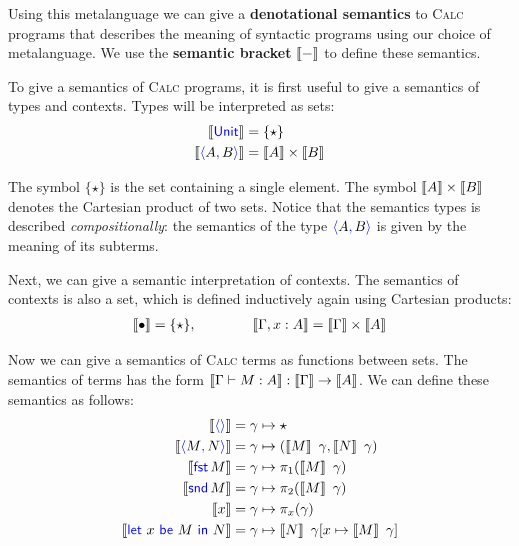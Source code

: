 Using this metalanguage we can give a \textbf{denotational semantics} to
\textsc{Calc} programs that describes the meaning of syntactic programs using 
our choice of metalanguage.
We use the \textbf{semantic bracket} $\left\llbracket - \right\rrbracket$ to define these semantics.

To give a semantics of \textsc{Calc} programs, it is first useful to give a
semantics of types and contexts.  Types will be interpreted as sets:
\begin{align*}
  \dbracket{\plUnit} &= \{\star\} \\
  \dbracket{\plpair{A}{B}} &= \dbracket{A} \times \dbracket{B}
\end{align*}

The symbol $\{\star\}$ is the set containing a single element. The symbol
$\left\llbracket A \right\rrbracket \times \left\llbracket B \right\rrbracket$ denotes the Cartesian product of two sets.
Notice that the semantics types is described \emph{compositionally}: the 
semantics of the type $\plpair{A}{B}$ is given by the meaning of its subterms.

Next, we can give a semantic interpretation of contexts. The semantics of 
contexts is also a set, which is defined inductively 
again using Cartesian products:
\begin{align*}
  \left\llbracket \bullet \right\rrbracket = \{\star\},
  \qquad\qquad
  \left\llbracket \Gamma, x : A \right\rrbracket =  \left\llbracket \Gamma \right\rrbracket \times \left\llbracket A \right\rrbracket
\end{align*}

Now we can give a semantics of \textsc{Calc} terms as functions between sets. 
The semantics of terms has the form $\left\llbracket \Gamma \vdash M : A \right\rrbracket
: \left\llbracket \Gamma \right\rrbracket \to \left\llbracket A \right\rrbracket$.
We can define these semantics as follows:
\begin{align*}
  \dbracket{\plunit{}} &= \gamma \mapsto \star\\
  \dbracket{\plpair{M}{N}} &= \gamma \mapsto (\dbracket{M}~\gamma, \dbracket{N}~\gamma) \\
  \dbracket{\plfst{M}} &= \gamma \mapsto \pi_1 (\dbracket{M}~\gamma) \\
  \dbracket{\plsnd{M}} &= \gamma \mapsto \pi_2 (\dbracket{M}~\gamma) \\
  \dbracket{x} &= \gamma \mapsto \pi_x (\gamma) \\
  \dbracket{\pllet{x}{M}{N}} &= \gamma \mapsto \dbracket{N}~\gamma[x \mapsto \dbracket{M}~\gamma]
\end{align*}

